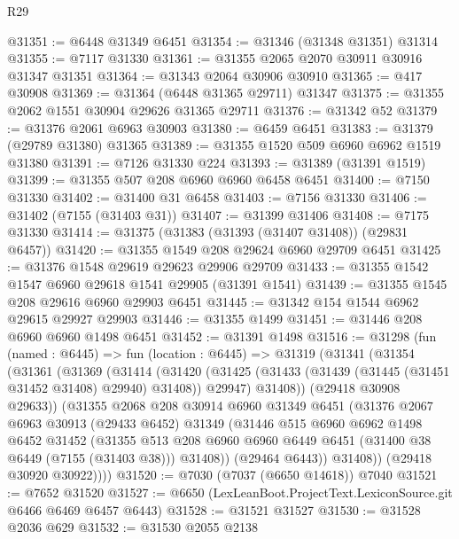 \begin{lexlean}{R29}
\begin{coremodule}
@31351 := @6448 @31349 @6451
@31354 := @31346 (@31348 @31351) @31314
@31355 := @7117 @31330
@31361 := @31355 @2065 @2070 @30911 @30916 @31347 @31351
@31364 := @31343 @2064 @30906 @30910
@31365 := @417 @30908
@31369 := @31364 (@6448 @31365 @29711) @31347
@31375 := @31355 @2062 @1551 @30904 @29626 @31365 @29711
@31376 := @31342 @52
@31379 := @31376 @2061 @6963 @30903
@31380 := @6459 @6451
@31383 := @31379 (@29789 @31380) @31365
@31389 := @31355 @1520 @509 @6960 @6962 @1519 @31380
@31391 := @7126 @31330 @224
@31393 := @31389 (@31391 @1519)
@31399 := @31355 @507 @208 @6960 @6960 @6458 @6451
@31400 := @7150 @31330
@31402 := @31400 @31 @6458
@31403 := @7156 @31330
@31406 := @31402 (@7155 (@31403 @31))
@31407 := @31399 @31406
@31408 := @7175 @31330
@31414 := @31375 (@31383 (@31393 (@31407 @31408)) (@29831 @6457))
@31420 := @31355 @1549 @208 @29624 @6960 @29709 @6451
@31425 := @31376 @1548 @29619 @29623 @29906 @29709
@31433 := @31355 @1542 @1547 @6960 @29618 @1541 @29905 (@31391 @1541)
@31439 := @31355 @1545 @208 @29616 @6960 @29903 @6451
@31445 := @31342 @154 @1544 @6962 @29615 @29927 @29903
@31446 := @31355 @1499
@31451 := @31446 @208 @6960 @6960 @1498 @6451
@31452 := @31391 @1498
@31516 := @31298
    (fun (named : @6445) =>
    fun (location : @6445) =>
    @31319
      (@31341
        (@31354
          (@31361
            (@31369
              (@31414
                (@31420
                  (@31425 (@31433 (@31439 (@31445 (@31451 @31452 @31408) @29940) @31408)) @29947)
                  @31408))
              (@29418 @30908 @29633))
            (@31355
              @2068
              @208
              @30914
              @6960
              @31349
              @6451
              (@31376
                @2067
                @6963
                @30913
                (@29433 @6452)
                @31349
                (@31446
                  @515
                  @6960
                  @6962
                  @1498
                  @6452
                  @31452
                  (@31355
                    @513
                    @208
                    @6960
                    @6960
                    @6449
                    @6451
                    (@31400 @38 @6449 (@7155 (@31403 @38)))
                    @31408))
                (@29464 @6443))
              @31408))
          (@29418 @30920 @30922))))
@31520 := @7030 (@7037 (@6650 @14618)) @7040
@31521 := @7652 @31520
@31527 := @6650 (LexLeanBoot.ProjectText.LexiconSource.git @6466 @6469 @6457 @6443)
@31528 := @31521 @31527
@31530 := @31528 @2036 @629
@31532 := @31530 @2055 @2138

\end{coremodule}
\end{lexlean}
